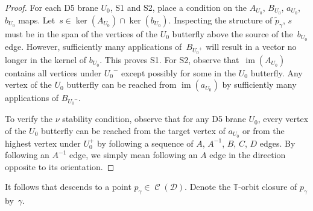 \documentclass[11pt]{article}
\numberwithin{equation}{section}
\newcommand{\brane}{\mathcal D}
\newcommand{\torus}{\mathbb T}
\newcommand{\MM}{\mathbb M}
\newcommand{\prequot}{\widetilde \MM^s}
\DeclareMathOperator{\bowvar}{\mathcal C}
\DeclareMathOperator{\im}{im}
\begin{document}
\begin{proof}
For each D5 brane $U_0$, S1 and S2, place a condition on the $A_{U_0}$, $B_{U_0}$, $a_{U_0}$, $b_{U_0}$ maps. Let~${s \in \ker(A_{U_0}) \cap \ker(b_{U_0})}$. Inspecting the structure of $\tilde{p}_\gamma$, $s$ must be in the span of the vertices of the $U_0$ butterfly above the source of the~$b_{U_0}$ edge. However, sufficiently many applications of~$B_{{U_0}^+}$ will result in a vector no longer in the kernel of $b_{U_0}$. This proves S1. For S2, observe that~$\im(A_{U_0})$ contains all vertices under ${U_0}^-$ except possibly for some in the $U_0$ butterfly. Any vertex of the $U_0$ butterfly can be reached from $\im(a_{U_0})$ by sufficiently many applications of $B_{{U_0}^-}$.

To verify the $\nu$ stability condition, observe that for any D5 brane $U_0$, every vertex of the $U_0$ butterfly can be reached from the target vertex of $a_{U_0}$ or from the highest vertex under $U_0^+$ by following a sequence of $A$, $A^{-1}$, $B$, $C$, $D$ edges. By following an $A^{-1}$ edge, we simply mean following an $A$ edge in the direction opposite to its orientation.
\end{proof}

It follows that \smash{$\tilde{p}_\gamma \in \prequot$} descends to a point $p_\gamma \in \bowvar(\brane)$. Denote the $\torus$-orbit closure of $p_\gamma$ by~$\gamma$.
\end{document}
